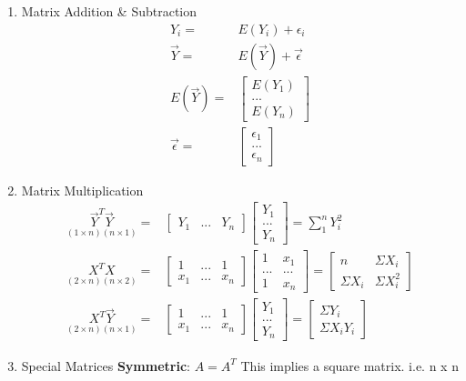 \documentclass[11pt]{article}
\begin{document}
\begin{enumerate}
\item Matrix Addition \& Subtraction
\label{sec:orged16da0}
\begin{equation}
\begin{split}
Y_i = & E(Y_i) + \epsilon_i\\
\vec{Y} = & E(\vec{Y}) + \vec{\epsilon}\\
E(\vec{Y}) = & \begin{bmatrix}
E(Y_1)\\
...\\
E(Y_n)
\end{bmatrix}\\
\vec{\epsilon{}} = & \begin{bmatrix}
\epsilon_1\\
...\\
\epsilon_n
\end{bmatrix}
\end{split}
\end{equation}

\item Matrix Multiplication
\label{sec:orga3fc4b3}
\begin{equation}
\begin{split}
\underset{(1 \times n)(n \times 1)}{\vec{Y}^T \vec{Y}} = & \begin{bmatrix}
Y_1 & ... & Y_n
\end{bmatrix}\begin{bmatrix}
Y_1\\
...\\
Y_n
\end{bmatrix} = \sum_{1}^{n}Y_i^2\\
\underset{(2 \times n)(n \times 2)}{X^T X} = & \begin{bmatrix}
1 & ... & 1\\
x_1 & ... & x_n
\end{bmatrix} \begin{bmatrix}
1 & x_1\\
... & ...\\
1 & x_n
\end{bmatrix} = \begin{bmatrix}
n & \Sigma X_i\\
\Sigma X_i & \Sigma X_i^2
\end{bmatrix}\\
\underset{(2 \times n)(n \times 1)}{X^T \vec{Y}} = & \begin{bmatrix}
1 & ... & 1\\
x_1 & ... & x_n
\end{bmatrix} \begin{bmatrix}
Y_1\\
...\\
Y_n
\end{bmatrix} = \begin{bmatrix}
\Sigma Y_i\\
\Sigma X_iY_i
\end{bmatrix}
\end{split}
\end{equation}
\item Special Matrices
\label{sec:orgd3cf42f}
\textbf{Symmetric}: \(A = A^T\)
This implies a square matrix. i.e. n x n


\end{enumerate}
\end{document}
